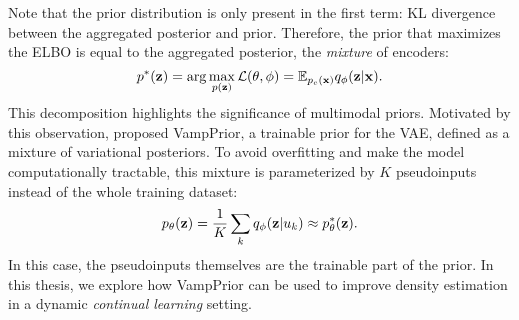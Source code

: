 \newline
Note that the prior distribution is only present in the first term: KL divergence between the aggregated posterior and prior. Therefore, the prior that maximizes the ELBO is equal to the aggregated posterior, the \textit{mixture} of encoders:
\begin{equation}
    p^*({\mathbf{z}}) = \arg\max_{p({\mathbf{z}})}\mathcal{L}(\theta, \phi) = \mathbb{E}_{p_e({\mathbf{x}})}q_{\phi}({\mathbf{z}}|{\mathbf{x}}).
\end{equation}
This decomposition highlights the significance of multimodal priors. 
Motivated by this observation, \citet{tomczak2018vae} proposed VampPrior, a trainable prior for the VAE, defined as a mixture of variational posteriors. 
To avoid overfitting and make the model computationally tractable, this mixture is parameterized by $K$ pseudoinputs instead of the whole training dataset:
\begin{equation}
    p_{\theta}({\mathbf{z}}) = \frac1K \sum_k q_{\phi}({\mathbf{z}}|u_k) \approx p_{\theta}^*({\mathbf{z}}).
\end{equation}
In this case, the pseudoinputs themselves are the trainable part of the prior. In this thesis, we explore how VampPrior can be used to improve density estimation in a dynamic \textit{continual learning} setting. 


